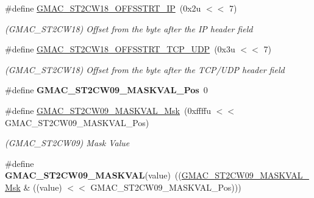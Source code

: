 \begin{DoxyCompactItemize}
\mbox{\label{group__SAMV71__GMAC_ga40b1bf76a1a1c980049ed299da2ce3af}} 
\#define \mbox{\hyperlink{group__SAMV71__GMAC_ga40b1bf76a1a1c980049ed299da2ce3af}{G\+M\+A\+C\+\_\+\+S\+T2\+C\+W18\+\_\+\+O\+F\+F\+S\+S\+T\+R\+T\+\_\+\+IP}}~(0x2u $<$$<$ 7)
\begin{DoxyCompactList}\small\item\em (G\+M\+A\+C\+\_\+\+S\+T2\+C\+W18) Offset from the byte after the IP header field \end{DoxyCompactList}\item 
\mbox{\label{group__SAMV71__GMAC_ga373f77af987ad6517f4d26c37ccfbcc4}} 
\#define \mbox{\hyperlink{group__SAMV71__GMAC_ga373f77af987ad6517f4d26c37ccfbcc4}{G\+M\+A\+C\+\_\+\+S\+T2\+C\+W18\+\_\+\+O\+F\+F\+S\+S\+T\+R\+T\+\_\+\+T\+C\+P\+\_\+\+U\+DP}}~(0x3u $<$$<$ 7)
\begin{DoxyCompactList}\small\item\em (G\+M\+A\+C\+\_\+\+S\+T2\+C\+W18) Offset from the byte after the T\+C\+P/\+U\+DP header field \end{DoxyCompactList}\item 
\mbox{\label{group__SAMV71__GMAC_ga4ce50d60a21c71b56a02a2ae9022b183}} 
\#define {\bfseries G\+M\+A\+C\+\_\+\+S\+T2\+C\+W09\+\_\+\+M\+A\+S\+K\+V\+A\+L\+\_\+\+Pos}~0
\item 
\mbox{\label{group__SAMV71__GMAC_ga58b8e99ec0fc2a1f7cd3c31478fba854}} 
\#define \mbox{\hyperlink{group__SAMV71__GMAC_ga58b8e99ec0fc2a1f7cd3c31478fba854}{G\+M\+A\+C\+\_\+\+S\+T2\+C\+W09\+\_\+\+M\+A\+S\+K\+V\+A\+L\+\_\+\+Msk}}~(0xffffu $<$$<$ G\+M\+A\+C\+\_\+\+S\+T2\+C\+W09\+\_\+\+M\+A\+S\+K\+V\+A\+L\+\_\+\+Pos)
\begin{DoxyCompactList}\small\item\em (G\+M\+A\+C\+\_\+\+S\+T2\+C\+W09) Mask Value \end{DoxyCompactList}\item 
\mbox{\label{group__SAMV71__GMAC_gadddce749d6806c9541783e9dd86b55ad}} 
\#define {\bfseries G\+M\+A\+C\+\_\+\+S\+T2\+C\+W09\+\_\+\+M\+A\+S\+K\+V\+AL}(value)~((\mbox{\hyperlink{group__SAMV71__GMAC_ga58b8e99ec0fc2a1f7cd3c31478fba854}{G\+M\+A\+C\+\_\+\+S\+T2\+C\+W09\+\_\+\+M\+A\+S\+K\+V\+A\+L\+\_\+\+Msk}} \& ((value) $<$$<$ G\+M\+A\+C\+\_\+\+S\+T2\+C\+W09\+\_\+\+M\+A\+S\+K\+V\+A\+L\+\_\+\+Pos)))

\end{DoxyCompactItemize}
